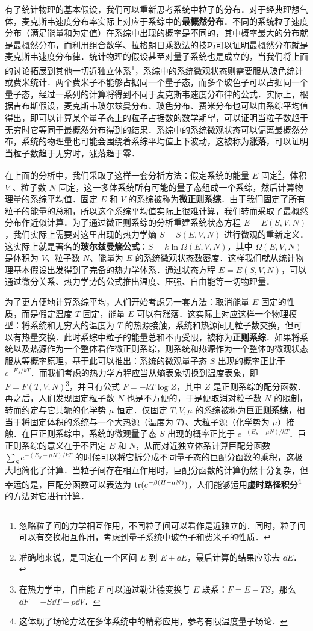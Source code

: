 有了统计物理的基本假设，我们可以重新思考系统中粒子的分布．对于经典理想气体，麦克斯韦速度分布率实际上对应于系综中的\textbf{最概然分布}．不同的系统粒子速度分布（满足能量和为定值）在系综中出现的概率是不同的，其中概率最大的分布就是最概然分布，而利用组合数学、拉格朗日乘数法的技巧可以证明最概然分布就是麦克斯韦速度分布律．统计物理的假设甚至对量子系统也是成立的，当我们将上面的讨论拓展到其他一切近独立体系\footnote{忽略粒子间的力学相互作用，不同粒子间可以看作是近独立的．同时，粒子间可以有交换相互作用，考虑到量子系统中玻色子和费米子的性质．}，系综中的系统微观状态则需要服从玻色统计或费米统计．两个费米子不能够占据同一个量子态，而多个玻色子可以占据同一个量子态，经过一系列的计算将得到不同于麦克斯韦速度分布律的公式．实际上，根据吉布斯假设，麦克斯韦玻尔兹曼分布、玻色分布、费米分布也可以由系综平均值得出，即可以计算某个量子态上的粒子占据数的数学期望，可以证明当粒子数趋于无穷时它等同于最概然分布得到的结果．系综中的系统微观状态可以偏离最概然分布，系统的物理量也可能会围绕着系综平均值上下波动，这被称为\textbf{涨落}，可以证明当粒子数趋于无穷时，涨落趋于零．

在上面的分析中，我们采取了这样一套分析方法：假定系统的能量 $E$ 固定\footnote{准确地来说，是固定在一个区间 $E$ 到 $E+\dd E$，最后计算的结果应除去 $\dd E$．}，体积 $V$ 、粒子数 $N$ 固定，这一多体系统所有可能的量子态组成一个系综，然后计算物理量的系综平均值．固定 $E$ 和 $V$ 的系综被称为\textbf{微正则系综}．由于我们固定了所有粒子的能量的总和，所以这个系综平均值实际上很难计算，我们转而采取了最概然分布作近似计算．为了通过微正则系综的分析重建系统状态方程 $E=E(S,V,N)$，我们实际上需要对这里出现的热力学熵 $S=S(E,V,N)$ 进行微观的重新定义．这实际上就是著名的\textbf{玻尔兹曼熵公式}：$S=k\ln \Omega(E,V,N)$，其中 $\Omega(E,V,N)$ 是体积为 $V$、粒子数 $N$、能量为 $E$ 的系统微观状态数密度．这样我们就从统计物理基本假设出发得到了完备的热力学体系．通过状态方程 $E=E(S,V,N)$，可以通过微分关系、热力学势的公式推出温度、压强、自由能等一切物理量．

为了更方便地计算系综平均，人们开始考虑另一套方法：取消能量 $E$ 固定的性质，而是假定温度 $T$ 固定，能量 $E$ 可以有涨落．这实际上对应这样一个物理模型：将系统和无穷大的温度为 $T$ 的热源接触，系统和热源间无粒子数交换，但可以有热量交换．此时系综中粒子的能量总和不再受限，被称为\textbf{正则系综}．如果将系统以及热源作为一个整体看作微正则系综，则系统和热源作为一个整体的微观状态服从等概率原理，基于此可以推出：系统的微观量子态 $S$ 出现的概率正比于 $e^{-E_S/kT}$．而我们考虑的热力学方程应当从熵表象切换到温度表象，即 $F=F(T,V,N)$\footnote{在热力学中，自由能 $F$ 可以通过勒让德变换与 $E$ 联系：$F=E-TS$，那么 $\dd F=-S\dd T-p\dd V$．}，并且有公式 $F=-kT\log Z$，其中 $Z$ 是正则系综的配分函数．再之后，人们发现固定粒子数 $N$ 也是不方便的，于是便取消对粒子数 $N$ 的限制，转而约定与它共轭的化学势 $\mu$ 恒定．仅固定 $T,V,\mu$ 的系综被称为\textbf{巨正则系综}，相当于将固定体积的系统与一个大热源（温度为 $T$）、大粒子源（化学势为 $\mu$）接触．在巨正则系综中，系统的微观量子态 $S$ 出现的概率正比于 $e^{-(E_S-\mu N)/kT}$．巨正则系综的意义在于不固定 $E$ 和 $N$，从而对近独立体系计算巨配分函数 $\sum_S e^{-(E_S-\mu N)/kT}$ 的时候可以将它拆分成不同量子态的巨配分函数的乘积，这极大地简化了计算．当粒子间存在相互作用时，巨配分函数的计算仍然十分复杂，但幸运的是，巨配分函数可以表达为 ${\rm tr} (e^{-\beta(\hat H-\mu N)})$，人们能够运用\textbf{虚时路径积分}\footnote{这体现了场论方法在多体系统中的精彩应用，参考有限温度量子场论．}的方法对它进行计算．